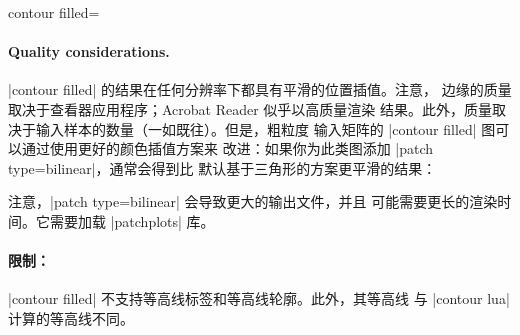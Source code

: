 {{\begin{plottype}[/pgfplots]{
    contour filled=\textcolor{black}{}%
}
\begin{codeexample}[]
\end{codeexample}


    \paragraph{Quality considerations.}

    |contour filled| 的结果在任何分辨率下都具有平滑的位置插值。注意，
    边缘的质量取决于查看器应用程序；Acrobat Reader 似乎以高质量渲染
    结果。此外，质量取决于输入样本的数量（一如既往）。但是，粗粒度
    输入矩阵的 |contour filled| 图可以通过使用更好的颜色插值方案来
    改进：如果你为此类图添加 |patch type=bilinear|，通常会得到比
    默认基于三角形的方案更平滑的结果：
\begin{codeexample}[]
\end{codeexample}
    \noindent 注意，|patch type=bilinear| 会导致更大的输出文件，并且
    可能需要更长的渲染时间。它需要加载 |patchplots| 库。


    \paragraph{限制：}

    |contour filled| 不支持等高线标签和等高线轮廓。此外，其等高线
    与 |contour lua| 计算的等高线不同。
\end{plottype}
}


}
